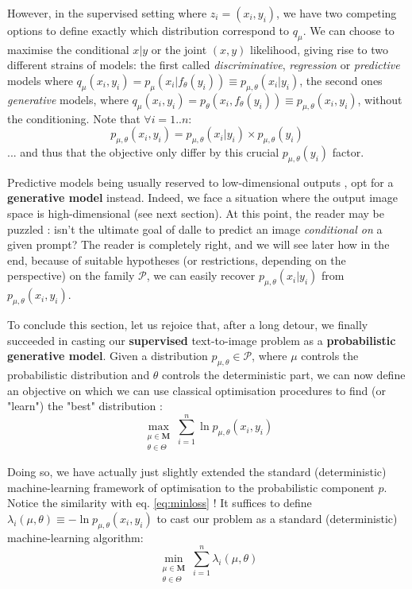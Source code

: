 \documentclass{article}
\begin{document}
\begin{multicols}{2}
However, in the supervised setting where $z_i=(x_i,y_i)$, we have two competing options to define exactly which distribution correspond to $q_\mu$. We can choose to maximise the conditional $x|y$ or the joint $(x,y)$ likelihood, giving rise to two different strains of models: the first called \textit{discriminative}, \textit{regression} or \textit{predictive} models where  $q_\mu(x_i,y_i)=p_{\mu}(x_i|f_\theta(y_i))\equiv p_{\mu,\theta}(x_i|y_i)$, the second ones \textit{generative} models, where $q_\mu(x_i,y_i)=p_\theta(x_i, f_\theta(y_i))\equiv p_{\mu,\theta}(x_i,y_i)$, without the conditioning. Note that $\forall i=1..n$: $$p_{\mu,\theta}(x_i, y_i)=p_{\mu,\theta}(x_i|y_i) \times p_{\mu,\theta}(y_i)$$ ... and thus that the objective only differ by this crucial $p_{\mu,\theta}(y_i)$ factor.

Predictive models being usually reserved to low-dimensional outputs \citep{probml-advanced}, \cite{zeroshot} opt for a \textbf{generative model} instead. Indeed, we face a situation where the output image space is high-dimensional (see next section). At this point, the reader may be puzzled : isn't the ultimate goal of \gls{dalle} to predict an image \textit{conditional on} a given prompt? The reader is completely right, and we will see later how in the end, because of suitable hypotheses (or restrictions, depending on the perspective) on the family $\mathcal{P}$, we can easily recover $p_{\mu,\theta}(x_i|y_i)$ from $p_{\mu,\theta}(x_i,y_i)$.

To conclude this section, let us rejoice that, after a long detour, we finally succeeded in casting our \textbf{supervised} text-to-image problem as a \textbf{probabilistic generative model}. Given a distribution $p_{\mu,\theta}\in\mathcal{P}$, where $\mu$ controls the probabilistic distribution and $\theta$ controls the deterministic part, we can now define an objective on which we can use classical optimisation procedures to find (or "learn") the "best" distribution :
$$\max_{\substack{\mu\in\mathbf{M}\\\theta \in \Theta}} \sum_{i=1}^n \ln p_{\mu,\theta}(x_i,y_i)$$

Doing so, we have actually just slightly extended the standard (deterministic) machine-learning framework of optimisation to the probabilistic component $p$. Notice the similarity with eq. \ref{eq:minloss} ! It suffices to define $\lambda_i(\mu,\theta)\equiv - \ln p_{\mu,\theta}(x_i,y_i)$ to cast our problem as a standard (deterministic) machine-learning algorithm:
$$\min_{\substack{\mu\in\mathbf{M}\\\theta \in \Theta}} \sum_{i=1}^n \lambda_i(\mu,\theta)$$


\end{multicols}
\end{document}
